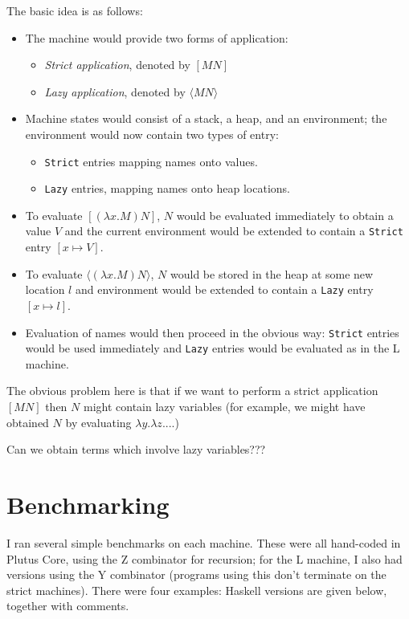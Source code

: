 \documentclass[a4paper]{article}
\begin{document}
The basic idea is as follows:
\begin{itemize}
\item The machine would provide two forms of application:
  \begin{itemize}
  \item \textit{Strict application}, denoted by $[M N]$
  \item \textit{Lazy application}, denoted by $\langle M N \rangle$
  \end{itemize}
  \item Machine states would consist of a stack, a heap, and an environment;
    the environment would now contain two types of entry:
  \begin{itemize}
  \item \texttt{Strict} entries mapping names onto values.
  \item \texttt{Lazy} entries, mapping names onto heap locations.
  \end{itemize}
  \item To evaluate $[(\lambda x.M) N]$, $N$ would be evaluated immediately
    to obtain a value $V$ and the current environment would be extended to
    contain a \texttt{Strict} entry $[x \mapsto V]$.
  \item To evaluate $\langle (\lambda x.M) N \rangle$, $N$ would be
    stored in the heap at some new location $l$ and
    environment would be extended to contain a \texttt{Lazy} entry
    $[x \mapsto l]$.
  \item Evaluation of names would then proceed in the obvious way:
    \texttt{Strict} entries would be used immediately and \texttt{Lazy}
    entries would be evaluated as in the L machine.
\end{itemize}


The obvious problem here is that if we want to perform
a strict application $[M N]$ then $N$ might contain lazy variables
(for example, we might have obtained $N$ by evaluating $\lambda y. \lambda z. ...$)

Can we obtain terms which involve lazy variables???


\section{Benchmarking}\label{sec:benchmarks}
I ran several simple benchmarks on each machine. These were all hand-coded
in Plutus Core, using the Z combinator for recursion; for the L machine, I also
had versions using the Y combinator (programs using this don't terminate on the 
strict machines).  There were four examples: Haskell versions are given below, 
together with comments.
\end{document}
